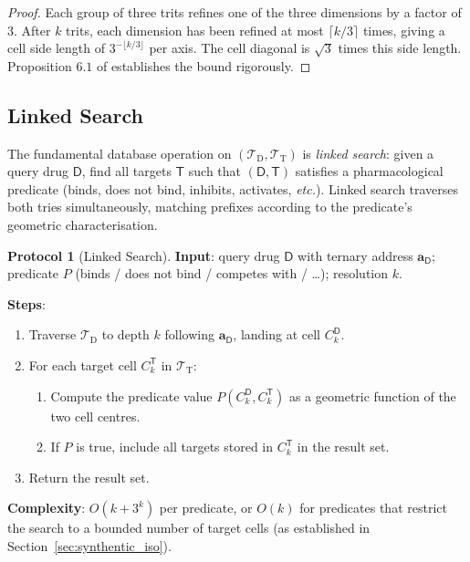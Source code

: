\documentclass[11pt,twocolumn,a4paper]{article}
\theoremstyle{definition}
\newtheorem{protocol}[theorem]{Protocol}
\theoremstyle{remark}
\newcommand{\Trie}{\mathcal{T}}
\newcommand{\Dtrie}{\Trie_{\mathrm{D}}}
\newcommand{\Ttrie}{\Trie_{\mathrm{T}}}
\newcommand{\Drug}{\mathsf{D}}
\newcommand{\Target}{\mathsf{T}}
\newcommand{\drugaddr}{\mathbf{a}_\Drug}
\begin{document}
\begin{proof}
Each group of three trits refines one of the three dimensions by a factor of 3. After $k$ trits, each dimension has been refined at most $\lceil k/3 \rceil$ times, giving a cell side length of $3^{-\lfloor k/3 \rfloor}$ per axis. The cell diagonal is $\sqrt{3}$ times this side length. Proposition $6.1$ of \citep{sachikonye2025c} establishes the bound rigorously.
\end{proof}

\subsection{Linked Search}

The fundamental database operation on $(\Dtrie, \Ttrie)$ is \emph{linked search}: given a query drug $\Drug$, find all targets $\Target$ such that $(\Drug, \Target)$ satisfies a pharmacological predicate (binds, does not bind, inhibits, activates, \emph{etc.}). Linked search traverses both tries simultaneously, matching prefixes according to the predicate's geometric characterisation.

\begin{protocol}[Linked Search]
\label{prot:linked_search}
\textbf{Input}: query drug $\Drug$ with ternary address $\drugaddr$; predicate $P$ (binds / does not bind / competes with / \ldots); resolution $k$.

\textbf{Steps}:
\begin{enumerate}[nosep,leftmargin=*]
\item Traverse $\Dtrie$ to depth $k$ following $\drugaddr$, landing at cell $C_k^\Drug$.
\item For each target cell $C_k^\Target$ in $\Ttrie$:
  \begin{enumerate}[nosep]
  \item[a.] Compute the predicate value $P(C_k^\Drug, C_k^\Target)$ as a geometric function of the two cell centres.
  \item[b.] If $P$ is true, include all targets stored in $C_k^\Target$ in the result set.
  \end{enumerate}
\item Return the result set.
\end{enumerate}

\textbf{Complexity}: $O(k + 3^k)$ per predicate, or $O(k)$ for predicates that restrict the search to a bounded number of target cells (as established in Section~\ref{sec:synthentic_iso}).
\end{protocol}
\end{document}
